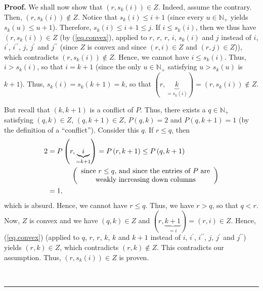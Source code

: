 \documentclass[numbers=enddot,12pt,final,onecolumn,notitlepage]{scrartcl}%
\theoremstyle{definition}
\newenvironment{proof}[1][Proof]{\noindent\textbf{#1.} }{\ \rule{0.5em}{0.5em}}
\newenvironment{verlong}{}{}
\begin{document}
\begin{verlong}
\begin{proof}
We shall now show that $\left(  r,s_{k}\left(  i\right)  \right)  \in Z$.
Indeed, assume the contrary. Then, $\left(  r,s_{k}\left(  i\right)  \right)
\notin Z$. Notice that $s_{k}\left(  i\right)  \leq i+1$ (since every
$u\in\mathbb{N}_{+}$ yields $s_{k}\left(  u\right)  \leq u+1$). Therefore,
$s_{k}\left(  i\right)  \leq i+1\leq j$. If $i\leq s_{k}\left(  i\right)  $,
then we thus have $\left(  r,s_{k}\left(  i\right)  \right)  \in Z$ (by
(\ref{eq.convex}), applied to $r$, $r$, $r$, $i$, $s_{k}\left(  i\right)  $
and $j$ instead of $i$, $i^{\prime}$, $i^{\prime\prime}$, $j$, $j^{\prime}$
and $j^{\prime\prime}$ (since $Z$ is convex and since $\left(  r,i\right)  \in
Z$ and $\left(  r,j\right)  \in Z$)), which contradicts $\left(
r,s_{k}\left(  i\right)  \right)  \notin Z$. Hence, we cannot have $i\leq
s_{k}\left(  i\right)  $. Thus, $i>s_{k}\left(  i\right)  $, so that $i=k+1$
(since the only $u\in\mathbb{N}_{+}$ satisfying $u>s_{k}\left(  u\right)  $ is
$k+1$). Thus, $s_{k}\left(  i\right)  =s_{k}\left(  k+1\right)  =k$, so that
$\left(  r,\underbrace{k}_{=s_{k}\left(  i\right)  }\right)  =\left(
r,s_{k}\left(  i\right)  \right)  \notin Z$.

But recall that $\left(  k,k+1\right)  $ is a conflict of $P$. Thus, there
exists a $q\in\mathbb{N}_{+}$ satisfying $\left(  q,k\right)  \in Z$, $\left(
q,k+1\right)  \in Z$, $P\left(  q,k\right)  =2$ and $P\left(  q,k+1\right)
=1$ (by the definition of a \textquotedblleft conflict\textquotedblright).
Consider this $q$. If $r\leq q$, then%
\begin{align*}
2  &  =P\left(  r,\underbrace{i}_{=k+1}\right)  =P\left(  r,k+1\right)  \leq
P\left(  q,k+1\right) \\
&  \ \ \ \ \ \ \ \ \ \ \left(
\begin{array}
[c]{c}%
\text{since }r\leq q\text{, and since the entries of }P\text{ are}\\
\text{weakly increasing down columns}%
\end{array}
\right) \\
&  =1,
\end{align*}
which is absurd. Hence, we cannot have $r\leq q$. Thus, we have $r>q$, so that
$q<r$. Now, $Z$ is convex and we have $\left(  q,k\right)  \in Z$ and $\left(
r,\underbrace{k+1}_{=i}\right)  =\left(  r,i\right)  \in Z$. Hence,
(\ref{eq.convex}) (applied to $q$, $r$, $r$, $k$, $k$ and $k+1$ instead of
$i$, $i^{\prime}$, $i^{\prime\prime}$, $j$, $j^{\prime}$ and $j^{\prime\prime
}$) yields $\left(  r,k\right)  \in Z$, which contradicts $\left(  r,k\right)
\notin Z$. This contradicts our assumption. Thus, $\left(  r,s_{k}\left(
i\right)  \right)  \in Z$ is proven.


\end{proof}
\end{verlong}
\end{document}
